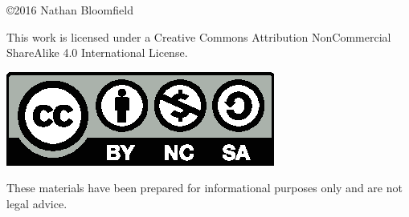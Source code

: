 \thispagestyle{empty}

\vspace{60pt}

\begin{center}
\copyright 2016 Nathan Bloomfield
\end{center}

\vspace{96pt}

\begin{center}
\begin{minipage}{0.8\textwidth}
\begin{center}
This work is licensed under a Creative Commons Attribution NonCommercial ShareAlike 4.0 International License.

\vspace{12pt}

\includegraphics[scale=0.8]{src/ring/gfx/by-nc-sa.eps}
\end{center}
\end{minipage}
\end{center}

\vspace{240pt}

\begin{center}
\begin{minipage}{0.7\textwidth}
\begin{center}
These materials have been prepared for informational purposes only and are not legal advice.
\end{center}
\end{minipage}
\end{center}
